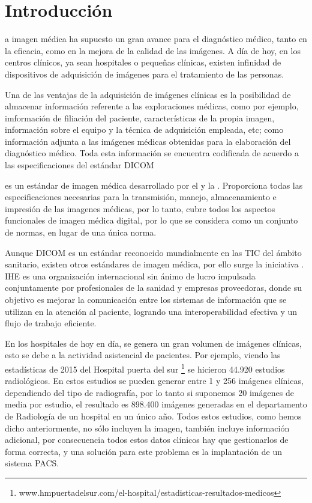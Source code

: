 \chapter{Introducción}
\label{chap:intro}

 a imagen médica ha supuesto un gran avance para el diagnóstico médico, tanto en la eficacia, como en la mejora de la calidad de las imágenes. A día de hoy, en los centros clínicos, ya sean hospitales o pequeñas clínicas, existen infinidad de dispositivos de adquisición de imágenes para el tratamiento de las personas.

Una de las ventajas de la adquisición de imágenes clínicas es la posibilidad de almacenar información referente a las exploraciones médicas, como por ejemplo, imformación de filiación del paciente, características de la propia imagen, información sobre el equipo y la técnica de adquisición empleada, etc; como información adjunta a las imágenes médicas obtenidas para la elaboración del diagnóstico médico. Toda esta información se encuentra codificada de acuerdo a las especificaciones del estándar \acs{DICOM}\cite{1}

\textbf{} es un estándar de imagen médica desarrollado por el  y la . Proporciona todas las especificaciones necesarias para la transmisión, manejo, almacenamiento e impresión de las imagenes médicas, por lo tanto, cubre todos los aspectos funcionales de imagen médica digital, por lo que se considera como un conjunto de normas, en lugar de una única norma.

Aunque \acs{DICOM} es un estándar reconocido mundialmente en las TIC del ámbito sanitario, existen otros estándares de imagen médica, por ello surge la iniciativa \textbf{} \cite{2}. \acs{IHE} es una organización internacional sin ánimo de lucro impulsada conjuntamente por profesionales de la sanidad y empresas proveedoras, donde su objetivo es mejorar la comunicación entre los sistemas de información que se utilizan en la atención al paciente, logrando una interoperabilidad efectiva y un flujo de trabajo eficiente.

En los hospitales de hoy en día, se genera un gran volumen de imágenes clínicas, esto se debe a la actividad asistencial de pacientes. Por ejemplo, viendo las estadísticas de 2015 del Hospital puerta del sur \footnote{www.hmpuertadelsur.com/el-hospital/estadisticas-resultados-medicos} se hicieron 44.920 estudios radiológicos. En estos estudios se pueden generar entre 1 y 256 imágenes clínicas, dependiendo del tipo de radiografía, por lo tanto si suponemos 20 imágenes de media por estudio, el resultado es 898.400 imágenes generadas en el departamento de Radiología de un hospital en un único año. Todos estos estudios, como hemos dicho anteriormente, no sólo incluyen la imagen, también incluye información adicional, por consecuencia todos estos datos clínicos hay que gestionarlos de forma correcta, y una solución para este problema es la implantación de un sistema \acs{PACS}.

